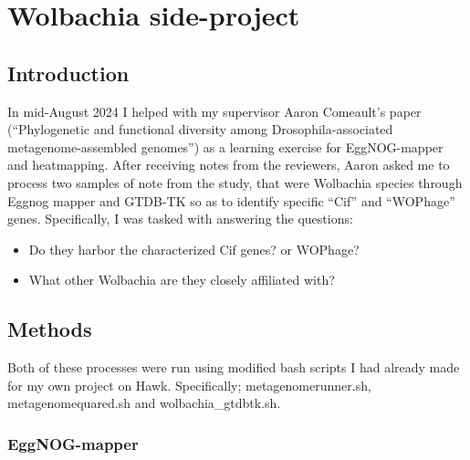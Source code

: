 \documentclass[
  letterpaper,
  DIV=11,
  numbers=noendperiod]{scrreprt}
\begin{document}
\chapter{Wolbachia side-project}\label{wolbachia-side-project}

\section{Introduction}\label{introduction-14}

In mid-August 2024 I helped with my supervisor Aaron Comeault's paper
(``Phylogenetic and functional diversity among Drosophila-associated
metagenome-assembled genomes'') as a learning exercise for EggNOG-mapper
and heatmapping. After receiving notes from the reviewers, Aaron asked
me to process two samples of note from the study, that were Wolbachia
species through Eggnog mapper and GTDB-TK so as to identify specific
``Cif'' and ``WOPhage'' genes. Specifically, I was tasked with answering
the questions:

\begin{itemize}
\item
  Do they harbor the characterized Cif genes? or WOPhage?
\item
  What other Wolbachia are they closely affiliated with?
\end{itemize}

\section{Methods}\label{methods-10}

Both of these processes were run using modified bash scripts I had
already made for my own project on Hawk. Specifically;
metagenomerunner.sh, metagenomequared.sh and wolbachia\_gtdbtk.sh.

\subsection{EggNOG-mapper}\label{eggnog-mapper}
\end{document}
